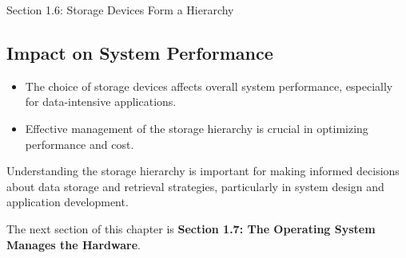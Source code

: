 \begin{notes}{Section 1.6: Storage Devices Form a Hierarchy}
    \subsection*{Impact on System Performance}

    \begin{itemize}
        \item The choice of storage devices affects overall system performance, especially for data-intensive applications.
        \item Effective management of the storage hierarchy is crucial in optimizing performance and cost.
    \end{itemize}
    
    Understanding the storage hierarchy is important for making informed decisions about data storage and retrieval strategies, particularly in system design and application development.    
\end{notes}

The next section of this chapter is \textbf{Section 1.7: The Operating System Manages the Hardware}.

